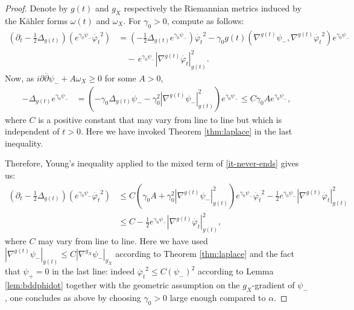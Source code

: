 \documentclass[10pt,a4paper]{amsart}
\newcommand{\f}{\varphi}
\begin{document}
\begin{proof}
Denote by $g(t)$ and $g_X$ respectively the Riemannian metrics induced by the K\"ahler forms $\omega(t)$ and $\omega_X$.
For $\gamma_0>0$, compute as follows:
\begin{equation}
\begin{split}\label{it-never-ends}
\left(\partial_t-\frac{1}{2}\Delta_{g(t)}\right)\left(e^{\gamma_0\psi_{-}}\dot{\f_t}^2\right)&=\left(-\frac{1}{2}\Delta_{g(t)}e^{\gamma_0\psi_{-}}\right)\dot{\f_t}^2-\gamma_0g(t)\left(\nabla^{g(t)}\psi_{-},\nabla^{g(t)}\dot{\f_t}^2\right)e^{\gamma_0\psi_{-}}\\
&\quad-\,e^{\gamma_0\psi_{-}}|\nabla^{g(t)}\dot{\f_t}|^2_{g(t)}.
\end{split}
\end{equation}
Now, as $i\partial\overline{\partial}\psi_{-}+A\omega_X\geq 0$ for some $A> 0$, 
\begin{equation*}
\begin{split}
-\Delta_{g(t)}e^{\gamma_0\psi_{-}}&=\left(-\gamma_0\Delta_{g(t)} \psi_{-}-\gamma_0^2|\nabla^{g(t)}\psi_{-}|^2_{g(t)}\right)e^{\gamma_0\psi_{-}}\leq C\gamma_0 Ae^{\gamma_0\psi_{-}},
\end{split}
\end{equation*}
where $C$ is a positive constant that may vary from line to line but which is independent of $t>0$. Here we have invoked Theorem \ref{thm:laplace} in the last inequality. 

Therefore, Young's inequality applied to the mixed term of \eqref{it-never-ends} gives us:
\begin{equation}
\begin{split}\label{est-0-undergrad}
\left(\partial_t-\frac{1}{2}\Delta_{g(t)}\right)\left(e^{\gamma_0\psi_{-}}\dot{\f_t}^2\right)&
\leq C\left(\gamma_0A+\gamma_0^2|\nabla^{g(t)}\psi_{-}|^2_{g(t)}\right)e^{\gamma_0\psi_{-}}\dot{\f_t}^2 -\frac{1}{2}e^{\gamma_0\psi_{-}}|\nabla^{g(t)}\dot{\f_t}|^2_{g(t)}\\
&\leq C -\frac{1}{2}e^{\gamma_0\psi_{-}}|\nabla^{g(t)}\dot{\f_t}|^2_{g(t)} ,
\end{split}
\end{equation}
where $C$ may vary from line to line. Here we have used  $|\nabla^{g(t)}\psi_{-}|_{g(t)}\leq C|\nabla^{g_X}\psi_{-}|_{g_X}$ according to Theorem \ref{thm:laplace} and the fact that $\psi_+=0$ in the last line: indeed  $\dot{\f_t}^2\leq C(\psi_{-})^2$ according to Lemma \ref{lem:bddphidot} together with the geometric assumption on the $g_X$-gradient of $\psi_{-}$, one concludes as above by choosing $\gamma_0>0$ large enough compared to $\alpha$. 


\end{proof}
\end{document}
